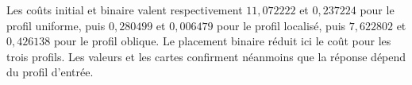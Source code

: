 Les coûts initial et binaire valent respectivement $11,072222$ et $0,237224$ pour le profil uniforme, puis $0,280499$ et $0,006479$ pour le profil localisé, puis $7,622802$ et $0,426138$ pour le profil oblique. Le placement binaire réduit ici le coût pour les trois profils. Les valeurs et les cartes confirment néanmoins que la réponse dépend du profil d’entrée.
